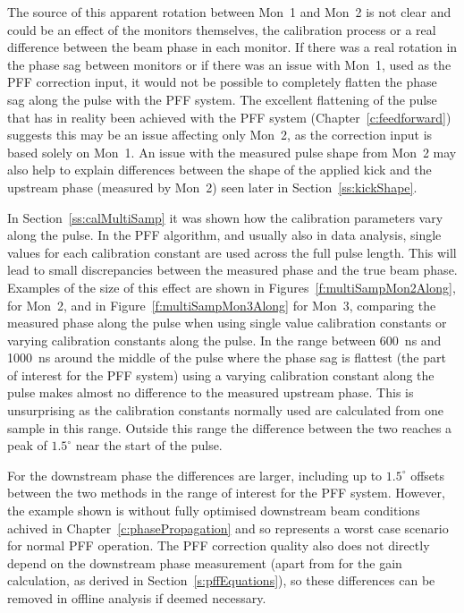 The source of this apparent rotation between Mon~1 and Mon~2 is not clear and could be an effect of the monitors themselves, the calibration process or a real difference between the beam phase in each monitor. If there was a real rotation in the phase sag between monitors or if there was an issue with Mon~1, used as the PFF correction input, it would not be possible to completely flatten the phase sag along the pulse with the PFF system. The excellent flattening of the pulse that has in reality been achieved with the PFF system (Chapter~\ref{c:feedforward}) suggests this may be an issue affecting only Mon~2, as the correction input is based solely on Mon~1. An issue with the measured pulse shape from Mon~2 may also help to explain differences between the shape of the applied kick and the upstream phase (measured by Mon~2) seen later in Section~\ref{ss:kickShape}.



In Section~\ref{ss:calMultiSamp} it was shown how the calibration parameters vary along the pulse. In the PFF algorithm, and usually also in data analysis, single values for each calibration constant are used across the full pulse length. This will lead to small discrepancies between the measured phase and the true beam phase. Examples of the size of this effect are shown in Figures~\ref{f:multiSampMon2Along}, for Mon~2, and in Figure~\ref{f:multiSampMon3Along} for Mon~3, comparing the measured phase along the pulse when using single value calibration constants or varying calibration constants along the pulse. In the range between 600~ns and 1000~ns around the middle of the pulse where the phase sag is flattest (the part of interest for the PFF system) using a varying calibration constant along the pulse makes almost no difference to the measured upstream phase. This is unsurprising as the calibration constants normally used are calculated from one sample in this range. Outside this range the difference between the two reaches a peak of \(1.5^\circ\) near the start of the pulse.

For the downstream phase the differences are larger, including up to \(1.5^\circ\) offsets between the two methods in the range of interest for the PFF system. However, the example shown is without fully optimised downstream beam conditions achived in Chapter~\ref{c:phasePropagation} and so represents a worst case scenario for normal PFF operation. The PFF correction quality also does not directly depend on the downstream phase measurement (apart from for the gain calculation, as derived in Section~\ref{s:pffEquations}), so these differences can be removed in offline analysis if deemed necessary.



